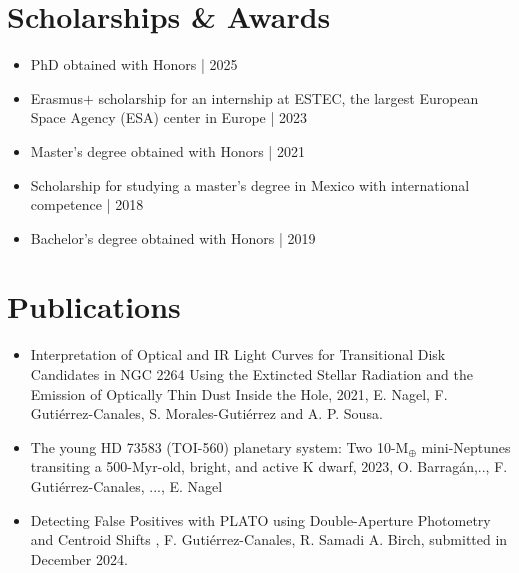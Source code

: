 \documentclass[11pt,a4paper]{article}
\begin{document}
	\section{Scholarships \& Awards}
	\begin{itemize}
		\item PhD obtained with Honors | 2025
		\item Erasmus$+$ scholarship for an internship at ESTEC, the largest European Space Agency (ESA) center in Europe | 2023
		\item Master's degree obtained with Honors | 2021
		\item Scholarship for studying a master's degree in Mexico with international competence | 2018
		\item Bachelor's degree obtained with Honors | 2019
	\end{itemize}
	
	\section{Publications}
	\begin{itemize}
		\item Interpretation of Optical and IR Light Curves for Transitional Disk Candidates in NGC 2264 Using the Extincted Stellar Radiation and the Emission of Optically Thin Dust Inside the Hole, 2021, E. Nagel, F. Gutiérrez-Canales, S. Morales-Gutiérrez and A. P. Sousa.
		\item The young HD 73583 (TOI-560) planetary system: Two 10-M$_{\oplus}$ mini-Neptunes transiting a 500-Myr-old, bright, and active K dwarf, 2023, O. Barrag\'an,.., F. Gutiérrez-Canales, ..., E. Nagel
		\item Detecting False Positives with PLATO using Double-Aperture Photometry and Centroid Shifts , F. Gutiérrez-Canales, R. Samadi A. Birch, submitted in December 2024.
	\end{itemize}
	
\end{document}
